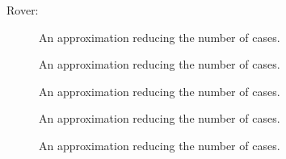 \newcommand{\rover} {rover3/roverLinear1d3}
\newcommand{\pir} {pir/piramid2d}

Rover:
\begin{figure}[h]
\center
{}
\caption{An approximation reducing the number of cases.}
\label{steplin} 
\end{figure}

\begin{figure}[h]
\center
{}
\caption{An approximation reducing the number of cases.}
\label{steplin} 
\end{figure}

\begin{figure}[h]
\center
{}
\caption{An approximation reducing the number of cases.}
\label{steplin} 
\end{figure}

\begin{figure}[h]
\center
{}
\caption{An approximation reducing the number of cases.}
\label{steplin} 
\end{figure}

\begin{figure}[h]
\center
{}
\caption{An approximation reducing the number of cases.}
\label{steplin} 
\end{figure}

